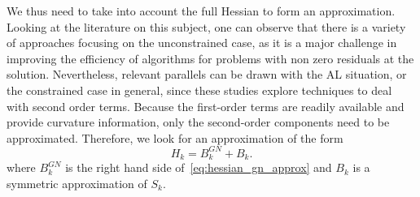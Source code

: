 We thus need to take into account the full Hessian to form an approximation. Looking at the literature on this subject, one can observe that there is a variety of approaches focusing on the unconstrained case, as it is a major challenge in improving the efficiency of algorithms for problems with non zero residuals at the solution. Nevertheless, relevant parallels can be drawn with the AL situation, or the constrained case in general, since these studies explore techniques to deal with second order terms. Because the first-order terms are readily available and provide curvature information, only the second-order components need to be approximated. Therefore, we look for an approximation of the form 
\begin{equation}\label{eq:hessian_full_approx}
	H_k = B^{GN}_k + B_k.
\end{equation}
where $B^{GN}_k$ is the right hand side of~\eqref{eq:hessian_gn_approx} and $B_k$ is a symmetric approximation of $S_k$. 

